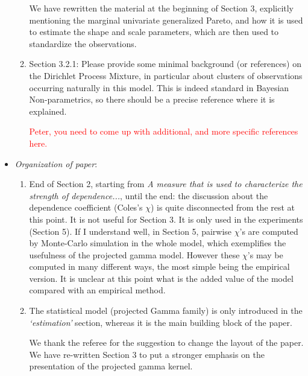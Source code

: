 \documentclass[10pt]{article}
\newcommand{\bruno}[1]{\textcolor{red}{#1}}
\begin{document}
\begin{itemize}
\begin{enumerate}
        We have rewritten the material at the beginning of Section 3, explicitly mentioning the marginal
        univariate generalized Pareto, and how it is used to estimate the shape and scale parameters, 
        which are then used to standardize the observations.

    \item Section 3.2.1: Please provide some minimal background (or references) on the Dirichlet 
        Process Mixture, in particular about clusters of observations occurring naturally in this 
        model. This is indeed standard in Bayesian Non-parametrics, so there should be a precise 
        reference where it is explained.

        \bruno{Peter, you need to come up with additional, and more specific references here.}

        
\end{enumerate}

\item \emph{Organization of paper}:
    \begin{enumerate}
        \item End of Section 2, starting from \emph{A measure that is used to characterize 
            the strength of dependence...}, until the end: the discussion about the dependence 
            coefficient (Coles’s $\chi$) is quite disconnected from the rest at this point. It
            is not useful for Section 3. It is only used in the experiments (Section 5). If I 
            understand well, in Section 5, pairwise $\chi$’s are computed by Monte-Carlo simulation 
            in the whole model, which exemplifies the usefulness of the projected gamma model. 
            However these $\chi$’s may be computed in many different ways, the most simple being 
            the empirical version. It is unclear at this point what is the added value of the 
            model compared with an empirical method.

        \item The statistical model (projected Gamma family) is only introduced in the
            \emph{‘estimation’} section, whereas it is the main building block of the paper.

            We thank the referee for the suggestion to change the layout of the paper. We have
            re-written Section 3 to put a stronger emphasis on the presentation of the
            projected gamma kernel.
            
        \end{enumerate}


\end{itemize}
\end{document}

